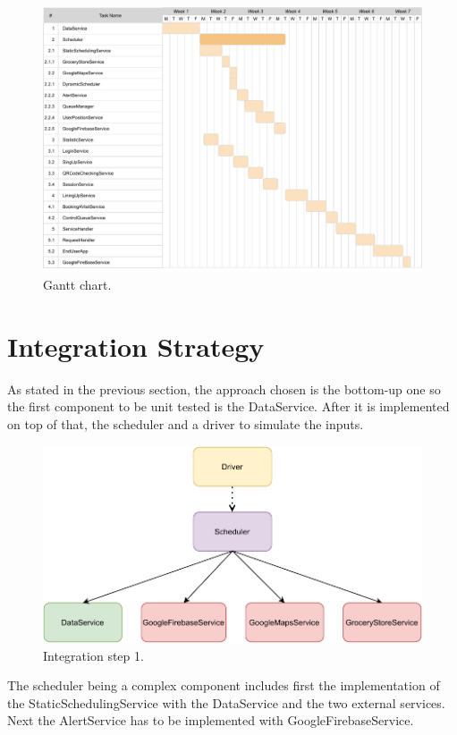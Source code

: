 \begin{figure}[H]
    \centering
    \includegraphics[width=1.0\textwidth]{images/Gantt.pdf}
    \caption{Gantt chart.}\label{fig:Gantt}
\end{figure}

\section{Integration Strategy}

As stated in the previous section, the approach chosen is the bottom-up one so the first component to be unit tested is the DataService. After it is implemented on top of that, the scheduler and a driver to simulate the inputs.

\begin{figure}[H]
    \centering
    \includegraphics[width=1.0\textwidth]{images/component1.pdf}
    \caption{Integration step 1.}
\end{figure}

The scheduler being a complex component includes first the implementation of the StaticSchedulingService with the DataService and the two external services. Next the AlertService has to be implemented with GoogleFirebaseService.

